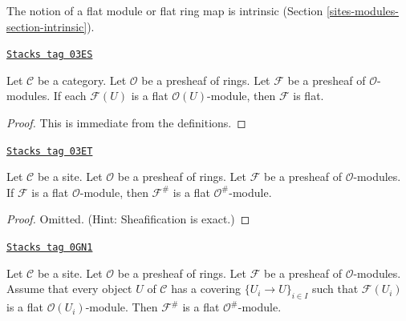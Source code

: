 The notion of a flat module or flat ring map is intrinsic
(Section \ref{sites-modules-section-intrinsic}).

\begin{lemma}
\label{sites-modules-lemma-flatness-presheaves}
\href{https://stacks.math.columbia.edu/tag/03ES}{\texttt{Stacks tag 03ES}}

Let $\mathcal{C}$ be a category.
Let $\mathcal{O}$ be a presheaf of rings.
Let $\mathcal{F}$ be a presheaf of $\mathcal{O}$-modules.
If each $\mathcal{F}(U)$ is a flat $\mathcal{O}(U)$-module,
then $\mathcal{F}$ is flat.
\end{lemma}

\begin{proof}
This is immediate from the definitions.
\end{proof}

\begin{lemma}
\label{sites-modules-lemma-flatness-sheafification}
\href{https://stacks.math.columbia.edu/tag/03ET}{\texttt{Stacks tag 03ET}}

Let $\mathcal{C}$ be a site.
Let $\mathcal{O}$ be a presheaf of rings.
Let $\mathcal{F}$ be a presheaf of $\mathcal{O}$-modules.
If $\mathcal{F}$ is a flat $\mathcal{O}$-module, then
$\mathcal{F}^\#$ is a flat $\mathcal{O}^\#$-module.
\end{lemma}

\begin{proof}
Omitted. (Hint: Sheafification is exact.)
\end{proof}

\begin{lemma}
\label{sites-modules-lemma-flatness-sheafification-refined}
\href{https://stacks.math.columbia.edu/tag/0GN1}{\texttt{Stacks tag 0GN1}}

Let $\mathcal{C}$ be a site. Let $\mathcal{O}$ be a presheaf of rings.
Let $\mathcal{F}$ be a presheaf of $\mathcal{O}$-modules. Assume
that every object $U$ of $\mathcal{C}$ has a covering $\{U_i \to U\}_{i \in I}$
such that $\mathcal{F}(U_i)$ is a flat $\mathcal{O}(U_i)$-module.
Then $\mathcal{F}^\#$ is a flat $\mathcal{O}^\#$-module.
\end{lemma}

